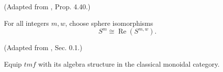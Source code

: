 \begin{definition}
\label{frontier:Literature:572b7f00f725}
(Adapted from \cite{Pst}, Prop. 4.40.)\par{}

For all integers $m,w$, choose sphere isomorphisms\[S^m\cong\operatorname{Re}(S^{m,w}).\]
\end{definition}

\begin{definition}
\label{frontier:Literature:5894b2586cbc}
(Adapted from \cite{BR21}, Sec. 0.1.)\par{}

Equip $\mathit{tmf}$ with its algebra structure in the classical monoidal category.
\end{definition}

